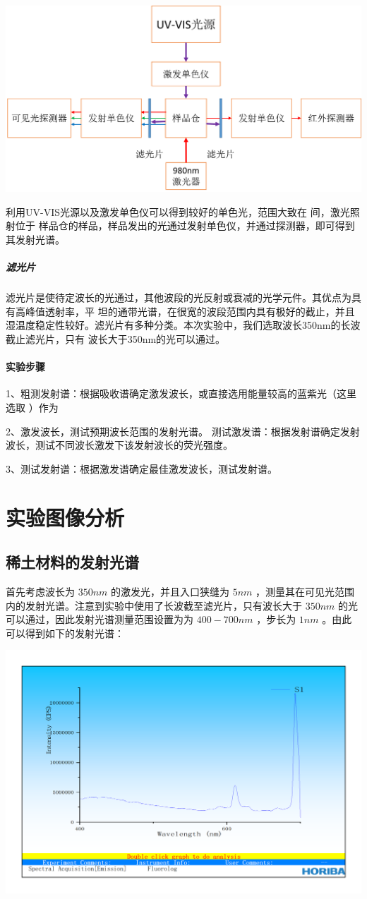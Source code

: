 \documentclass[hyperref]{ctexart}
\begin{document}
\begin{multicols}{2}
		
		\includegraphics[width = 0.75\linewidth]{apparatus_stru.png}
		
		
		利用UV-VIS光源以及激发单色仪可以得到较好的单色光，范围大致在 间，激光照射位于
		样品仓的样品，样品发出的光通过发射单色仪，并通过探测器，即可得到其发射光谱。

		
		\subparagraph{滤光片}
		滤光片是使待定波长的光通过，其他波段的光反射或衰减的光学元件。其优点为具有高峰值透射率，平
		坦的通带光谱，在很宽的波段范围内具有极好的截止，并且湿温度稳定性较好。滤光片有多种分类。本次实验中，我们选取波长350nm的长波截止滤光片，只有 波长大于350nm的光可以通过。
		
		
		
		\paragraph{实验步骤}
		1、粗测发射谱：根据吸收谱确定激发波长，或直接选用能量较高的蓝紫光（这里选取 ）作为
		
		
		2、激发波长，测试预期波长范围的发射光谱。
		测试激发谱：根据发射谱确定发射波长，测试不同波长激发下该发射波长的荧光强度。
		
		
		3、测试发射谱：根据激发谱确定最佳激发波长，测试发射谱。

	
		
		\section{实验图像分析}
		\subsection{稀土材料的发射光谱}
		首先考虑波长为 $350nm$ 的激发光，并且入口狭缝为 $5nm$ ，测量其在可见光范围内的发射光谱。注意到实验中使用了长波截至滤光片，只有波长大于 $350nm$ 的光可以通过，因此发射光谱测量范围设置为为 $400-700nm$ ，步长为 $1nm$ 。由此可以得到如下的发射光谱：
		
		
		\includegraphics[width = 0.75\linewidth]{RE_Emission_Spectroscopy_400-700_350.png}
		

\end{multicols}
\end{document}

